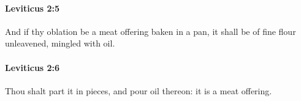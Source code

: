 		\paragraph{Leviticus 2:5} %
			\label{LEVITICUS-2-5}

			And if thy oblation be a meat offering baken in a pan, it shall be of fine flour unleavened, mingled with oil.


		\paragraph{Leviticus 2:6} %
			\label{LEVITICUS-2-6}

			Thou shalt part it in pieces, and pour oil thereon: it is a meat offering.



